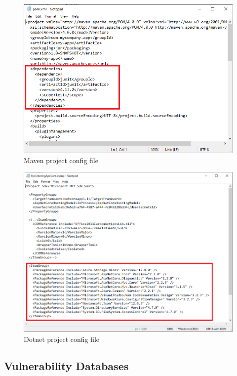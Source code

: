 \begin{figure}[H]
	\includegraphics[width=15cm]{includes/pom.PNG}
	\centering
	\caption{Maven project config file}
	\label{fig:pom}
\end{figure}
\begin{figure}[H]
	\includegraphics[width=15cm]{includes/dotnet.PNG}
	\centering
	\caption{Dotnet project config file}
	\label{fig:dotnet}
\end{figure}



\subsection{Vulnerability Databases}
